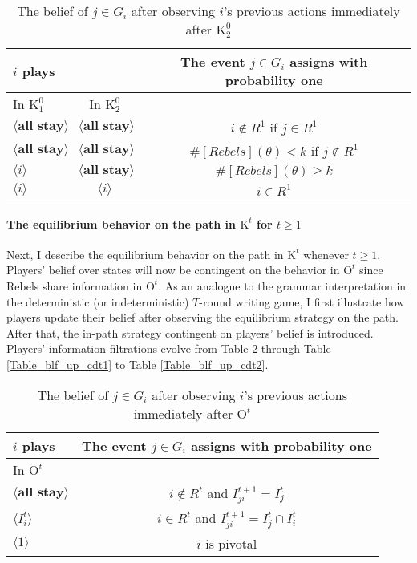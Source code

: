 \documentclass[12pt,letter]{article}
\newcommand{\Kappa}{\mathrm{K}}
\newcommand{\Omicron}{\mathrm{O}}
\theoremstyle{definition}
\theoremstyle{remark}
\theoremstyle{claim}
\begin{document}
\begin{table}[!htbp]
\caption{The belief of $j\in G_i$ after observing $i$'s previous actions immediately after $\Kappa^0_{2}$}
\label{Table_blf_up_cd02}
\begin{center}
\begin{tabular}{l  c | c}
 	$i$ plays	  	&  	  &The event $j\in G_i$ assigns with probability one \\
\hline
\hline
	In $\Kappa^0_{1}$		&			In $\Kappa^0_{2}$	&  \\
\hline
  $\langle \textbf{all stay} \rangle$	&  $\langle \textbf{all stay} \rangle$ &  $i\notin R^1$ if $j\in R^1$ \\
  $\langle \textbf{all stay} \rangle$	&  $\langle \textbf{all stay} \rangle$ &  $\#[Rebels](\theta)< k$ if $j\notin R^1$\\
  $\langle i \rangle$	&	$\langle \textbf{all stay} \rangle$ &  $\#[Rebels](\theta)\geq k$    \\
  $\langle i \rangle$	&	$\langle i \rangle$ &  $i\in R^1$  \\
  \hline
\end{tabular}
\end{center}
\end{table}

\clearpage

\paragraph{The equilibrium behavior on the path in $\Kappa^t$ for $t\geq 1$}
Next, I describe the equilibrium behavior on the path in $\Kappa^t$ whenever $t\geq 1$. Players' belief over states will now be contingent on the behavior in $\Omicron^t$ since Rebels share information in $\Omicron^t$. As an analogue to the grammar interpretation in the deterministic (or indeterministic) $T$-round writing game, I first illustrate how players update their belief after observing the equilibrium strategy on the path. After that, the in-path strategy contingent on players' belief is introduced. Players' information filtrations evolve from Table \ref{Table_blf_up_rpt} through Table \ref{Table_blf_up_cdt1} to Table \ref{Table_blf_up_cdt2}.

\begin{table}[!htbp]
\caption{The belief of $j\in G_i$ after observing $i$'s previous actions immediately after $\Omicron^t$ }
\label{Table_blf_up_rpt}
\begin{center}
\begin{tabular}{l | c}
 $i$ plays  		&	 The event $j\in G_i$ assigns with probability one \\
\hline
\hline
 In $\Omicron^t$		&					 \\
\hline
$\langle \textbf{all stay} \rangle$  &     $i\notin R^t$ and $I^{t+1}_{ji}=I^t_j$ \\
$\langle I^t_{i} \rangle$  &     $i\in R^t$ and $I^{t+1}_{ji}=I^t_j\cap I^t_{i}$ \\
$\langle 1 \rangle$  & 	  $i$ is pivotal    \\
  \hline
\end{tabular}
\end{center}
\end{table}
\end{document}
